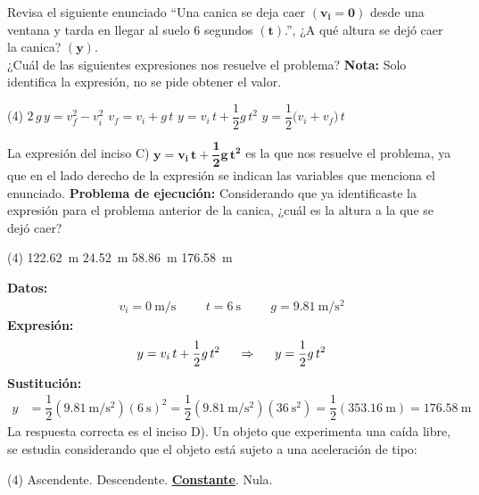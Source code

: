 \documentclass[12pt, letter]{exam}
\begin{document}
\begin{questions}
    \question Revisa el siguiente enunciado \enquote{Una canica se deja caer $\mathbf{(v_{i} = 0)}$ desde una ventana y tarda en llegar al suelo \num{6} segundos $\mathbf{(t)}$.}, ¿A qué altura se dejó caer la canica? $\mathbf{(y)}$. 
    \\
    ¿Cuál de las siguientes expresiones nos resuelve el problema? \textbf{Nota: } Solo identifica la expresión, no se pide obtener el valor.
    \begin{tasks}(4)
        \task $2 \, g \, y = v_{f}^{2} - v_{i}^{2}$
        \task $v_{f} = v_{i} + g \, t$
        \task $y = v_{i} \, t + \dfrac{1}{2} g \, t^{2}$
        \task $y = \dfrac{1}{2} \big( v_{i} + v_{f} \big) \, t$
    \end{tasks}
    La expresión del inciso C) $\mathbf{y = v_{i} \, t + \dfrac{1}{2} g \, t^{2}}$ es la que nos resuelve el problema, ya que en el lado derecho de la expresión se indican las variables que menciona el enunciado.
    \question \label{Problema_02} \textbf{Problema de ejecución:} Considerando que ya identificaste la expresión para el problema anterior de la canica, ¿cuál es la altura a la que se dejó caer?
    \begin{tasks}(4)
        \task \SI{122.62}{\meter}
        \task \SI{24.52}{\meter}
        \task \SI{58.86}{\meter}
        \task \SI{176.58}{\meter}
    \end{tasks}
    \textbf{Datos:}
    \begin{align*}
    v_{i} = \SI{0}{\meter\per\second} \hspace{1cm} t = \SI{6}{\second} \hspace{1cm} g = \SI{9.81}{\meter\per\square\second}
    \end{align*}
    \textbf{Expresión:}
    \begin{align*}
    y = v_{i} \, t + \dfrac{1}{2} g \, t^{2} \hspace{0.5cm} \Rightarrow \hspace{0.5cm} y = \dfrac{1}{2} g \, t^{2}
    \end{align*}
    \textbf{Sustitución:}
    \begin{align*}
    y &= \dfrac{1}{2} \left( \SI{9.81}{\meter\per\square\second} \right) \left( \SI{6}{\second} \right)^{2} =  \dfrac{1}{2} \left( \SI{9.81}{\meter\per\square\second} \right) \left( \SI{36}{\square\second} \right) = \dfrac{1}{2} \left( \SI{353.16}{\meter} \right) = \SI{176.58}{\meter}
    \end{align*}
    La respuesta correcta es el inciso D).
    \question Un objeto que experimenta una caída libre, se estudia considerando que el objeto está sujeto a una aceleración de tipo:
    \begin{tasks}(4)
        \task Ascendente.
        \task Descendente.
        \task \underline{\textbf{Constante}}.
        \task Nula.
    \end{tasks}


\end{questions}
\end{document}
